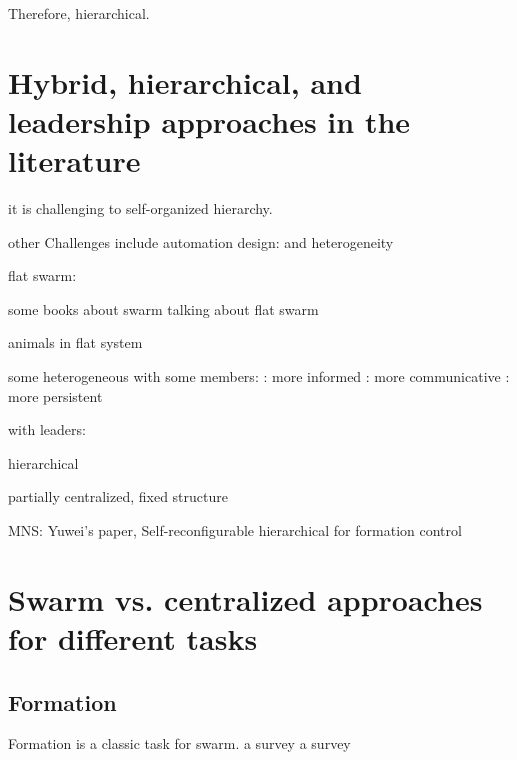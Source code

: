 Therefore, hierarchical.

\section{Hybrid, hierarchical, and leadership approaches in the literature}

\cite{dorigo2020reflections} it is challenging to self-organized hierarchy.

other Challenges include automation design:
\cite{francesca2016automatic}
\cite{birattari2019automatic}
\cite{salman2024automatic}
and heterogeneity 
\cite{kengyel2015potential}

flat swarm:
\cite{viragh2014flocking}
\cite{vasarhelyi2018optimized}

some books about swarm talking about flat swarm
\cite{beni1988concept}
\cite{bonabeau1999swarm}
\cite{csahin2004swarm}
\cite{floreano2008bio}

animals in flat system
\cite{buhl2006disorder}
\cite{detrain2008collective}
\cite{theraulaz1998origin}

some heterogeneous with some members:
\cite{firat2020self} : more informed 
\cite{valentini2016collective} : more communicative
\cite{balazs2020adaptive} : more persistent

with leaders:
\cite{gu2009leader}
\cite{amraii2014explicit}
\cite{zheng2020adversarial}
\cite{shan2020collective}
\cite{kaiser2022innate}

hierarchical
\cite{dalmao2011cucker}
\cite{pignotti2018flocking}
\cite{jia2019modelling}
\cite{divband2019photomorphogenesis}

\cite{zhou2022swarm} partially centralized, fixed structure

MNS:
\cite{mathews2017mergeable}
\cite{zhu2020formation}
\cite{zhang2023self} Yuwei's paper, Self-reconfigurable hierarchical for formation control
\cite{jamshidpey2020multi}
\cite{jamshidpey2024centralization}
\cite{jamshidpey2023reducing}

\section{Swarm vs. centralized approaches for different tasks}

\subsection{Formation}

Formation is a classic task for swarm.
\cite{liu2018survey} a survey
\cite{oh2015survey} a survey

